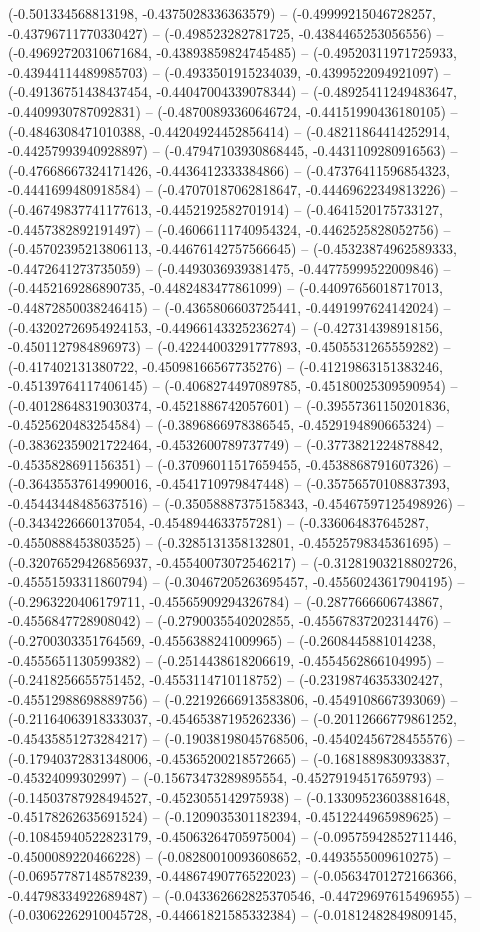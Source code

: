 (-0.501334568813198, -0.4375028336363579) -- (-0.49999215046728257, -0.43796711770330427) -- (-0.498523282781725, -0.4384465253056556) -- (-0.49692720310671684, -0.43893859824745485) -- (-0.49520311971725933, -0.43944114489985703) -- (-0.4933501915234039, -0.4399522094921097) -- (-0.49136751438437454, -0.44047004339078344) -- (-0.48925411249483647, -0.4409930787092831) -- (-0.48700893360646724, -0.44151990436180105) -- (-0.4846308471010388, -0.44204924452856414) -- (-0.48211864414252914, -0.44257993940928897) -- (-0.47947103930868445, -0.4431109280916563) -- (-0.47668667324171426, -0.4436412333384866) -- (-0.47376411596854323, -0.4441699480918584) -- (-0.47070187062818647, -0.44469622349813226) -- (-0.46749837741177613, -0.4452192582701914) -- (-0.4641520175733127, -0.4457382892191497) -- (-0.46066111740954324, -0.4462525828052756) -- (-0.45702395213806113, -0.44676142757566645) -- (-0.45323874962589333, -0.4472641273735059) -- (-0.4493036939381475, -0.44775999522009846) -- (-0.4452169286890735, -0.4482483477861099) -- (-0.44097656018717013, -0.44872850038246415) -- (-0.4365806603725441, -0.4491997624142024) -- (-0.43202726954924153, -0.44966143325236274) -- (-0.427314398918156, -0.4501127984896973) -- (-0.42244003291777893, -0.4505531265559282) -- (-0.417402131380722, -0.45098166567735276) -- (-0.41219863151383246, -0.45139764117406145) -- (-0.4068274497089785, -0.45180025309590954) -- (-0.40128648319030374, -0.4521886742057601) -- (-0.39557361150201836, -0.4525620483254584) -- (-0.3896866978386545, -0.4529194890665324) -- (-0.38362359021722464, -0.4532600789737749) -- (-0.3773821224878842, -0.4535828691156351) -- (-0.37096011517659455, -0.4538868791607326) -- (-0.36435537614990016, -0.4541710979847448) -- (-0.35756570108837393, -0.45443448485637516) -- (-0.35058887375158343, -0.45467597125498926) -- (-0.3434226660137054, -0.4548944633757281) -- (-0.336064837645287, -0.4550888453803525) -- (-0.3285131358132801, -0.45525798345361695) -- (-0.32076529426856937, -0.45540073072546217) -- (-0.31281903218802726, -0.45551593311860794) -- (-0.30467205263695457, -0.45560243617904195) -- (-0.2963220406179711, -0.45565909294326784) -- (-0.2877666606743867, -0.4556847728908042) -- (-0.2790035540202855, -0.45567837202314476) -- (-0.2700303351764569, -0.4556388241009965) -- (-0.2608445881014238, -0.4555651130599382) -- (-0.2514438618206619, -0.4554562866104995) -- (-0.2418256655751452, -0.4553114710118752) -- (-0.23198746353302427, -0.45512988698889756) -- (-0.22192666913583806, -0.4549108667393069) -- (-0.21164063918333037, -0.45465387195262336) -- (-0.20112666779861252, -0.45435851273284217) -- (-0.19038198045768506, -0.45402456728455576) -- (-0.17940372831348006, -0.45365200218572665) -- (-0.1681889830933837, -0.45324099302997) -- (-0.15673473289895554, -0.45279194517659793) -- (-0.14503787928494527, -0.4523055142975938) -- (-0.13309523603881648, -0.45178262635691524) -- (-0.1209035301182394, -0.4512244965989625) -- (-0.10845940522823179, -0.45063264705975004) -- (-0.09575942852711446, -0.4500089220466228) -- (-0.08280010093608652, -0.4493555009610275) -- (-0.06957787148578239, -0.44867490776522023) -- (-0.05634701272166366, -0.44798334922689487) -- (-0.043362662825370546, -0.44729697615496955) -- (-0.03062262910045728, -0.44661821585332384) -- (-0.01812482849809145, 